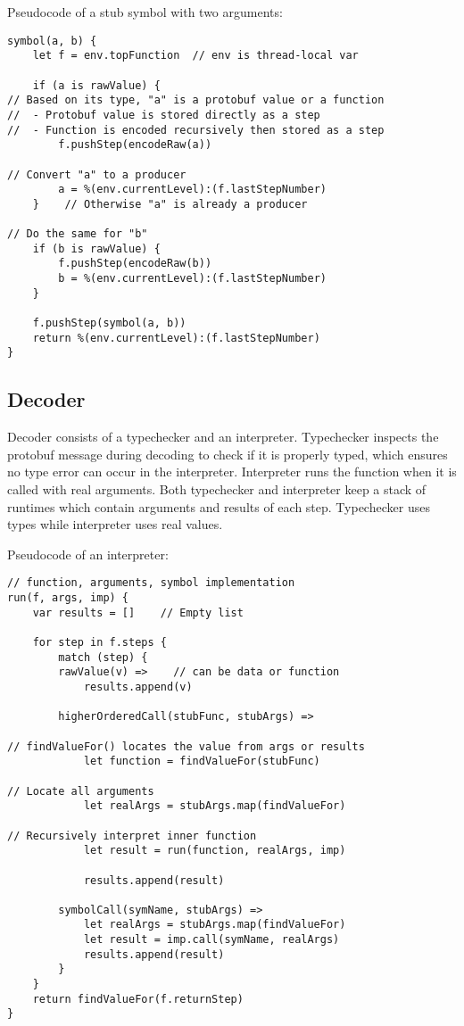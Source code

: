 \documentclass[12pt]{article}
\begin{document}
Pseudocode of a stub symbol with two arguments:
\begin{lstlisting}
symbol(a, b) {
    let f = env.topFunction  // env is thread-local var

    if (a is rawValue) {
// Based on its type, "a" is a protobuf value or a function
//  - Protobuf value is stored directly as a step
//  - Function is encoded recursively then stored as a step
        f.pushStep(encodeRaw(a))

// Convert "a" to a producer
        a = %(env.currentLevel):(f.lastStepNumber)
    }    // Otherwise "a" is already a producer

// Do the same for "b"
    if (b is rawValue) {
        f.pushStep(encodeRaw(b))
        b = %(env.currentLevel):(f.lastStepNumber)
    }

    f.pushStep(symbol(a, b))
    return %(env.currentLevel):(f.lastStepNumber)
}
\end{lstlisting}

\subsection{Decoder}
Decoder consists of a typechecker and an interpreter. Typechecker inspects the protobuf message during decoding to check if it is properly typed, which ensures no type error can occur in the interpreter. Interpreter runs the function when it is called with real arguments. Both typechecker and interpreter keep a stack of runtimes which contain arguments and results of each step. Typechecker uses types while interpreter uses real values.

Pseudocode of an interpreter:
\begin{lstlisting}
// function, arguments, symbol implementation
run(f, args, imp) {
    var results = []    // Empty list

    for step in f.steps {
        match (step) {
        rawValue(v) =>    // can be data or function
            results.append(v)

        higherOrderedCall(stubFunc, stubArgs) =>

// findValueFor() locates the value from args or results
            let function = findValueFor(stubFunc)

// Locate all arguments
            let realArgs = stubArgs.map(findValueFor)

// Recursively interpret inner function
            let result = run(function, realArgs, imp)

            results.append(result)

        symbolCall(symName, stubArgs) =>
            let realArgs = stubArgs.map(findValueFor)
            let result = imp.call(symName, realArgs)
            results.append(result)
        }
    }
    return findValueFor(f.returnStep)
}
\end{lstlisting}
\end{document}
